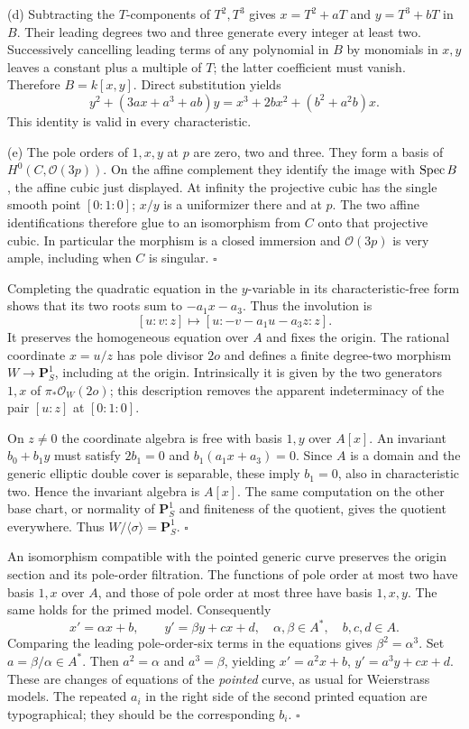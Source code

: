 \documentclass[11pt]{article}
\let\chapterexercise\exercise
\renewcommand{\exercise}[2]{\Needspace{8\baselineskip}\chapterexercise{#1}{#2}}
\begin{document}
(d) Subtracting the $T$-components of $T^2,T^3$ gives $x=T^2+aT$ and $y=T^3+bT$ in $B$. Their leading degrees two and three generate every integer at least two. Successively cancelling leading terms of any polynomial in $B$ by monomials in $x,y$ leaves a constant plus a multiple of $T$; the latter coefficient must vanish. Therefore $B=k[x,y]$. Direct substitution yields
\[ y^2+(3ax+a^3+ab)y=x^3+2bx^2+(b^2+a^2b)x. \]
This identity is valid in every characteristic.

(e) The pole orders of $1,x,y$ at $p$ are zero, two and three. They form a basis of $H^0(C,\mathcal O(3p))$. On the affine complement they identify the image with $\operatorname{Spec} B$, the affine cubic just displayed. At infinity the projective cubic has the single smooth point $[0:1:0]$; $x/y$ is a uniformizer there and at $p$. The two affine identifications therefore glue to an isomorphism from $C$ onto that projective cubic. In particular the morphism is a closed immersion and $\mathcal O(3p)$ is very ample, including when $C$ is singular. \hfill$\square$

\pf Completing the quadratic equation in the $y$-variable in its characteristic-free form shows that its two roots sum to $-a_1x-a_3$. Thus the involution is
\[ [u:v:z]\longmapsto[u:-v-a_1u-a_3z:z]. \]
It preserves the homogeneous equation over $A$ and fixes the origin. The rational coordinate $x=u/z$ has pole divisor $2o$ and defines a finite degree-two morphism $W\to\mathbf P^1_S$, including at the origin. Intrinsically it is given by the two generators $1,x$ of $\pi_*\mathcal O_W(2o)$; this description removes the apparent indeterminacy of the pair $[u:z]$ at $[0:1:0]$.

On $z\ne0$ the coordinate algebra is free with basis $1,y$ over $A[x]$. An invariant $b_0+b_1y$ must satisfy $2b_1=0$ and $b_1(a_1x+a_3)=0$. Since $A$ is a domain and the generic elliptic double cover is separable, these imply $b_1=0$, also in characteristic two. Hence the invariant algebra is $A[x]$. The same computation on the other base chart, or normality of $\mathbf P^1_S$ and finiteness of the quotient, gives the quotient everywhere. Thus $W/\langle\sigma\rangle=\mathbf P^1_S$. \hfill$\square$

\pf An isomorphism compatible with the pointed generic curve preserves the origin section and its pole-order filtration. The functions of pole order at most two have basis $1,x$ over $A$, and those of pole order at most three have basis $1,x,y$. The same holds for the primed model. Consequently
\[ x'=\alpha x+b,\qquad y'=\beta y+cx+d,
\quad\alpha,\beta\in A^*,\quad b,c,d\in A. \]
Comparing the leading pole-order-six terms in the equations gives $\beta^2=\alpha^3$. Set $a=\beta/\alpha\in A^*$. Then $a^2=\alpha$ and $a^3=\beta$, yielding $x'=a^2x+b$, $y'=a^3y+cx+d$. These are changes of equations of the \emph{pointed} curve, as usual for Weierstrass models. The repeated $a_i$ in the right side of the second printed equation are typographical; they should be the corresponding $b_i$. \hfill$\square$
\end{document}
